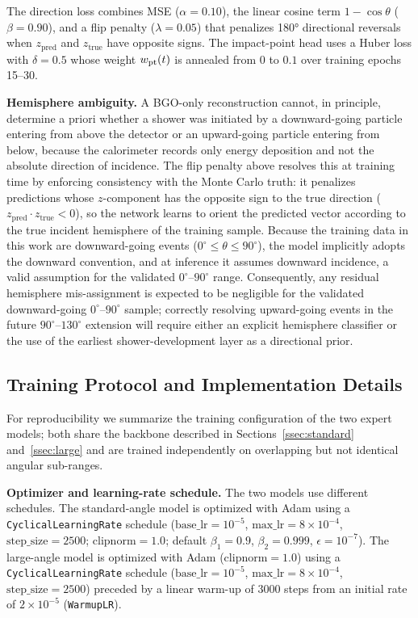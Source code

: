 \documentclass[preprint,12pt]{elsarticle}
\begin{document}
The direction loss combines MSE ($\alpha=0.10$), the linear cosine term $1-\cos\theta$ ($\beta=0.90$), and a flip penalty ($\lambda=0.05$) that penalizes 180° directional reversals when $z_{\text{pred}}$ and $z_{\text{true}}$ have opposite signs. The impact-point head uses a Huber loss with $\delta=0.5$ whose weight $w_{\rm pt}(t)$ is annealed from $0$ to $0.1$ over training epochs 15–30.

\textbf{Hemisphere ambiguity.} A BGO-only reconstruction cannot, in principle, determine a priori whether a shower was initiated by a downward-going particle entering from above the detector or an upward-going particle entering from below, because the calorimeter records only energy deposition and not the absolute direction of incidence. The flip penalty above resolves this at training time by enforcing consistency with the Monte Carlo truth: it penalizes predictions whose $z$-component has the opposite sign to the true direction ($z_{\text{pred}}\cdot z_{\text{true}}<0$), so the network learns to orient the predicted vector according to the true incident hemisphere of the training sample. Because the training data in this work are downward-going events ($0^{\circ}\le\theta\le 90^{\circ}$), the model implicitly adopts the downward convention, and at inference it assumes downward incidence, a valid assumption for the validated $0^{\circ}$--$90^{\circ}$ range. Consequently, any residual hemisphere mis-assignment is expected to be negligible for the validated downward-going $0^{\circ}$--$90^{\circ}$ sample; correctly resolving upward-going events in the future $90^{\circ}$--$130^{\circ}$ extension will require either an explicit hemisphere classifier or the use of the earliest shower-development layer as a directional prior.


\FloatBarrier

\subsection{Training Protocol and Implementation Details}
\label{ssec:training}

For reproducibility we summarize the training configuration of the two expert models; both share the backbone described in Sections~\ref{ssec:standard} and~\ref{ssec:large} and are trained independently on overlapping but not identical angular sub-ranges.

\textbf{Optimizer and learning-rate schedule.} The two models use different schedules. The standard-angle model is optimized with Adam using a \texttt{CyclicalLearningRate} schedule ($\mathrm{base\_lr}=10^{-5}$, $\mathrm{max\_lr}=8\times10^{-4}$, $\mathrm{step\_size}=2500$; $\mathrm{clipnorm}=1.0$; default $\beta_{1}=0.9$, $\beta_{2}=0.999$, $\epsilon=10^{-7}$). The large-angle model is optimized with Adam ($\mathrm{clipnorm}=1.0$) using a \texttt{CyclicalLearningRate} schedule ($\mathrm{base\_lr}=10^{-5}$, $\mathrm{max\_lr}=8\times10^{-4}$, $\mathrm{step\_size}=2500$) preceded by a linear warm-up of 3000 steps from an initial rate of $2\times10^{-5}$ (\texttt{WarmupLR}).
\end{document}
